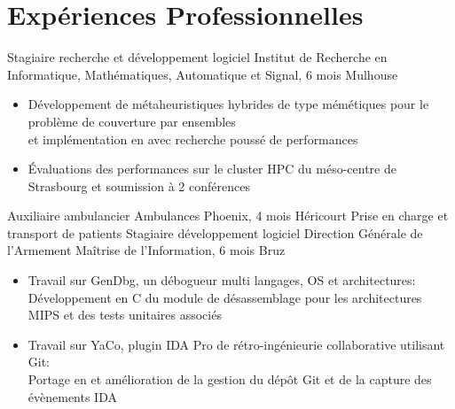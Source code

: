 \documentclass[a4paper,10pt,sans]{moderncv}
\begin{document}

	\vspace*{\deletedSpace}
	\section{Expériences Professionnelles}
			{Stagiaire recherche et développement logiciel}
			{Institut de Recherche en Informatique, Mathématiques, Automatique et Signal, 6 mois\hspace{-25pt}}
			{Mulhouse}
			{}
			{}
			\vspace{-5pt}
			\begin{itemize}
				\item Développement de métaheuristiques hybrides de type mémétiques pour le problème de couverture par ensembles\\
				et implémentation en \Cpp{} avec recherche poussé de performances
				\item Évaluations des performances sur le cluster HPC du méso-centre de Strasbourg et soumission à 2 conférences \cite{Pinard2020}
			\end{itemize}
			\vspace{5pt}
			{Auxiliaire ambulancier}
			{Ambulances Phoenix, 4 mois}
			{Héricourt}
			{Prise en charge et transport de patients}
			{}
			{Stagiaire développement logiciel}
			{Direction Générale de l'Armement Maîtrise de l'Information, 6 mois}
			{Bruz}
			{}
			{}
			\vspace{-5pt}
			\begin{itemize}
				\item Travail sur GenDbg, un débogueur multi langages, OS et architectures:\\
					\phantom{=}Développement en C du module de désassemblage pour les architectures MIPS et des tests unitaires associés
				\item Travail sur YaCo, plugin IDA Pro de rétro-ingénieurie collaborative utilisant Git:\\
					\phantom{=}Portage en \Cpp{} et amélioration de la gestion du dépôt Git et de la capture des évènements IDA
			\end{itemize}
\end{document}
